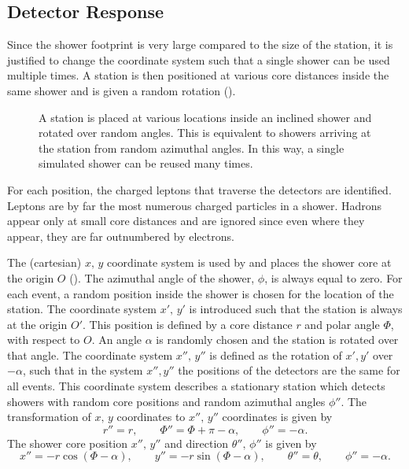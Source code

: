 \subsection{Detector Response}
\label{sec:detector-response}

Since the shower footprint is very large compared to the size of the
station, it is justified to change the coordinate system such that a single
shower can be used multiple times.  A station is then positioned at various
core distances inside the same shower and is given a random rotation
().

\begin{figure}
\centering

\caption{A station is placed at various locations inside an inclined
shower and rotated over random angles.  This is equivalent to showers
arriving at the station from random azimuthal angles.  In this way, a
single simulated shower can be reused many times.}
\label{fig:station-in-shower}
\end{figure}

For each position, the charged leptons that traverse the detectors are
identified.  Leptons are by far the most numerous charged particles in a
shower.  Hadrons appear only at small core distances and are ignored since
even where they appear, they are far outnumbered by electrons.

The (cartesian) $x,\, y$ coordinate system is used by \aires and places the
shower core at the origin $O$ ().  The azimuthal angle of the shower,
$\phi$, is always equal to zero.  For each event, a random position inside the
shower is chosen for the location of the station. The coordinate system $x',\,
y'$ is introduced such that the station is always at the origin $O'$. This
position is defined by a core distance $r$ and polar angle $\Phi$, with respect
to $O$.
An angle $\alpha$ is randomly chosen and the station is rotated over that angle.
The coordinate system $x'',\, y''$ is defined as the rotation of $x', y'$ over
$-\alpha$, such that in the system $x'', y''$ the positions of the detectors are
the same for all events.
This coordinate system describes a stationary station which detects showers with
random core positions and random azimuthal angles $\phi''$.
 The transformation of $x,\, y$ coordinates to $x'',\, y''$ coordinates is given
by
\begin{equation}
r'' = r, \qquad
\Phi'' = \Phi + \pi - \alpha, \qquad
\phi'' = -\alpha.
\end{equation}
The shower core position $x'',\, y''$ and direction $\theta'',\, \phi''$
is given by
\begin{equation}
x'' = -r\cos (\Phi - \alpha), \qquad
y'' = -r\sin (\Phi - \alpha), \qquad
\theta'' = \theta, \qquad
\phi'' = -\alpha.
\end{equation}

